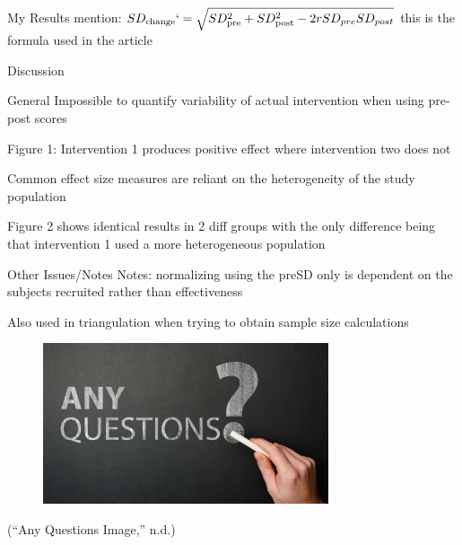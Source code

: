 \documentclass[
  ignorenonframetext,
  aspectratio=169,
]{beamer}
\begin{document}
\begin{frame}{My Results}
\protect\hypertarget{my-results}{}
mention:
\(SD_\text{change}`=\sqrt{SD_{\text{pre}}^2+SD_{\text{post}}^2-2rSD_{pre}SD_{post}}\)
this is the formula used in the article
\end{frame}

\begin{frame}{Discussion}
\protect\hypertarget{discussion}{}
\begin{block}{General}
\protect\hypertarget{general}{}
Impossible to quantify variability of actual intervention when using
pre-post scores

Figure 1: Intervention 1 produces positive effect where intervention two
does not

Common effect size measures are reliant on the heterogeneity of the
study population

Figure 2 shows identical results in 2 diff groups with the only
difference being that intervention 1 used a more heterogeneous
population
\end{block}

\begin{block}{Other Issues/Notes}
\protect\hypertarget{other-issuesnotes}{}
Notes: normalizing using the preSD only is dependent on the subjects
recruited rather than effectiveness

Also used in triangulation when trying to obtain sample size
calculations
\end{block}
\end{frame}

\begin{frame}{}
\protect\hypertarget{section}{}
\begin{figure}
\centering
\includegraphics[width=0.75\textwidth]{any-questions.jpeg}
\end{figure}

({``Any Questions Image,''} n.d.)
\end{frame}
\end{document}
